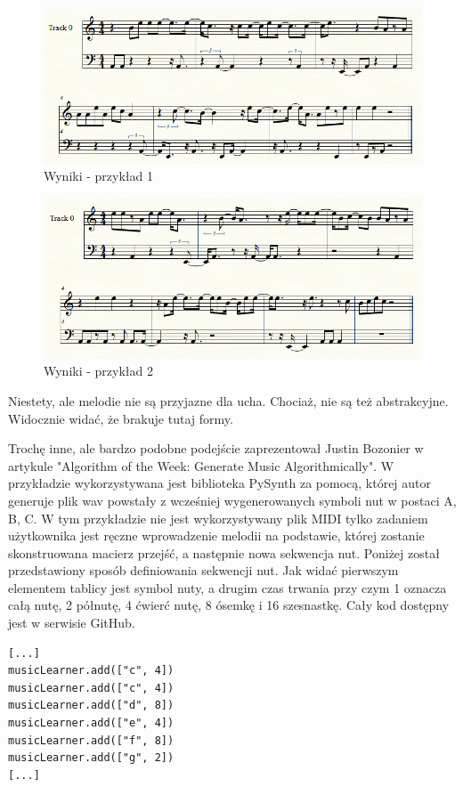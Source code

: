 \begin{figure}[H]
	\centering
	\includegraphics[width=0.7\linewidth]{przykad_1}
	\caption{Wyniki - przykład 1}
	\label{fig:przykad1}
\end{figure}

\begin{figure}[H]
	\centering
	\includegraphics[width=0.7\linewidth]{przyklad_2}
	\caption{Wyniki - przykład 2}
	\label{fig:przyklad2}
\end{figure}

Niestety, ale melodie nie są przyjazne dla ucha. Chociaż, nie są też abstrakcyjne. Widocznie widać, że brakuje tutaj formy.  

Trochę inne, ale bardzo podobne podejście zaprezentował Justin Bozonier w artykule "Algorithm of the Week: Generate Music Algorithmically". W przykładzie wykorzystywana jest biblioteka PySynth za pomocą, której autor generuje plik wav powstały z wcześniej wygenerowanych symboli nut w postaci A, B, C. W tym przykładzie nie jest wykorzystywany plik MIDI tylko zadaniem użytkownika jest ręczne wprowadzenie melodii na podstawie, której zostanie skonstruowana macierz przejść, a następnie nowa sekwencja nut. Poniżej został przedstawiony sposób definiowania sekwencji nut. Jak widać pierwszym elementem tablicy jest symbol nuty, a drugim czas trwania przy czym 1 oznacza całą nutę, 2 półnutę, 4 ćwierć nutę, 8 ósemkę i 16 szesnastkę. Cały kod dostępny jest w serwisie GitHub.

\begin{lstlisting}[caption={Sposób zapisu sekwencji nut},captionpos=b]
[...]
musicLearner.add(["c", 4])
musicLearner.add(["c", 4])
musicLearner.add(["d", 8])
musicLearner.add(["e", 4])
musicLearner.add(["f", 8])
musicLearner.add(["g", 2])
[...]
\end{lstlisting}

